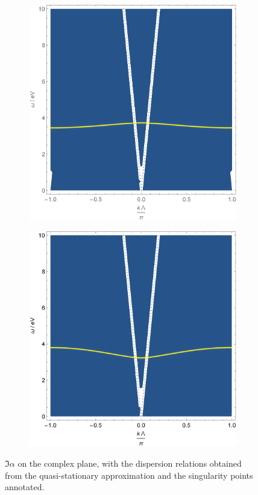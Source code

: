 \documentclass[hyperref, a4paper]{article}
\begin{document}
\begin{figure}
    \centering
    \begin{subfigure}{0.45\textwidth}
        \includegraphics[width=\textwidth]{alphaxy-annotated.pdf}
    \end{subfigure}
    \begin{subfigure}{0.45\textwidth}
        \includegraphics[width=\textwidth]{alphaz-annotated.pdf}
    \end{subfigure}
    \caption{$\Im \alpha$ on the complex plane, with the dispersion relations obtained from the 
    quasi-stationary approximation and the singularity points annotated.}
    \label{fig:all}
\end{figure}
\end{document}
